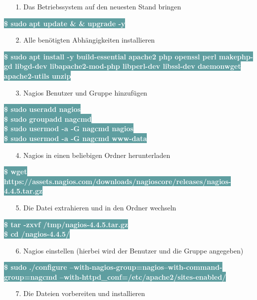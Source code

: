 \documentclass[fontsize=12pt,paper=a4,open=any,parskip=half,
  twoside=false,toc=listof,toc=bibliography,fleqn,leqno,
  captions=nooneline,captions=tableabove,british]{scrbook}
\begin{document}
\begin{itemize}
\item[1.] Das Betriebssystem auf den neuesten Stand bringen
\end{itemize}
\colorbox{CadetBlue}{\textcolor{white}{\textbf{\textsf{\$ sudo apt update \& \& upgrade -y}}}}
\begin{itemize}
\item[2.] Alle benötigten Abhängigkeiten installieren
\end{itemize}
\colorbox{CadetBlue}{\textcolor{white}{\textbf{\textsf{\$ sudo apt install -y build-essential apache2 php openssl perl makephp-gd libgd-dev libapache2-mod-php libperl-dev libssl-dev daemonwget apache2-utils unzip}}}}
\begin{itemize}
\item[3.] Nagios Benutzer und Gruppe hinzufügen
\end{itemize}
\colorbox{CadetBlue}{\textcolor{white}{\textbf{\textsf{\$ sudo useradd nagios}}}}\\
\colorbox{CadetBlue}{\textcolor{white}{\textbf{\textsf{\$ sudo groupadd nagcmd}}}}\\
\colorbox{CadetBlue}{\textcolor{white}{\textbf{\textsf{\$ sudo usermod -a -G nagcmd nagios}}}}\\
\colorbox{CadetBlue}{\textcolor{white}{\textbf{\textsf{\$ sudo usermod -a -G nagcmd www-data}}}}
\begin{itemize}
\item[4.] Nagios in einen beliebigen Ordner herunterladen
\end{itemize}
\colorbox{CadetBlue}{\textcolor{white}{\textbf{\textsf{\$ wget https://assets.nagios.com/downloads/nagioscore/releases/nagios-4.4.5.tar.gz}}}}
\begin{itemize}
\item[5.] Die Datei extrahieren und in den Ordner wechseln
\end{itemize}
\colorbox{CadetBlue}{\textcolor{white}{\textbf{\textsf{\$ tar -zxvf /tmp/nagios-4.4.5.tar.gz}}}}\\
\colorbox{CadetBlue}{\textcolor{white}{\textbf{\textsf{\$ cd /nagios-4.4.5/}}}}
\begin{itemize}
\item[6.] Nagios einstellen (hierbei wird der Benutzer und die Gruppe angegeben)
\end{itemize}
\colorbox{CadetBlue}{\textcolor{white}{\textbf{\textsf{\$ sudo ./configure --with-nagios-group=nagios--with-command-group=nagcmd --with-httpd\_conf=/etc/apache2/sites-enabled/}}}}
\begin{itemize}
\item[7.] Die Dateien vorbereiten und installieren
\end{itemize}
\end{document}
